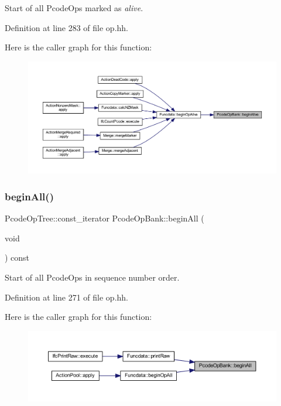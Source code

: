 Start of all Pcode\+Ops marked as {\itshape alive}. 



Definition at line 283 of file op.\+hh.

Here is the caller graph for this function\+:
\nopagebreak
\begin{figure}[H]
\begin{center}
\leavevmode
\includegraphics[width=350pt]{class_pcode_op_bank_a6c299f27d8d5aafd64fdd91324cddc24_icgraph}
\end{center}
\end{figure}
\mbox{\label{class_pcode_op_bank_ad92b658064cce0c096d1d2d2e19547b1}} 
\subsubsection{\texorpdfstring{beginAll()}{beginAll()}}
{\footnotesize\ttfamily Pcode\+Op\+Tree\+::const\+\_\+iterator Pcode\+Op\+Bank\+::begin\+All (\begin{DoxyParamCaption}\item[{void}]{ }\end{DoxyParamCaption}) const\hspace{0.3cm}{\ttfamily [inline]}}



Start of all Pcode\+Ops in sequence number order. 



Definition at line 271 of file op.\+hh.

Here is the caller graph for this function\+:
\nopagebreak
\begin{figure}[H]
\begin{center}
\leavevmode
\includegraphics[width=350pt]{class_pcode_op_bank_ad92b658064cce0c096d1d2d2e19547b1_icgraph}
\end{center}
\end{figure}
\mbox{\label{class_pcode_op_bank_a11c4847402571c3bc56dce8adb4df2ea}} 
